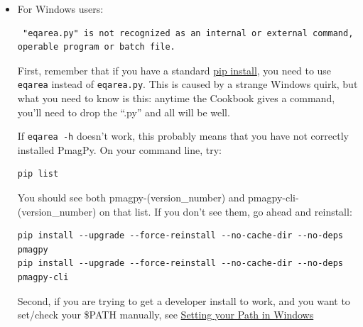 \documentclass[11pt]{book}
\begin{document}
{{{{{{\begin{enumerate}
\begin{itemize}



\item For Windows users:

\begin{verbatim} "eqarea.py" is not recognized as an internal or external command,
operable program or batch file.
\end{verbatim}

First, remember that if you have a standard \href{#pip_install}{pip install}, you need to use \texttt{eqarea} instead of \texttt{eqarea.py}. This is caused by a strange Windows quirk, but what you need to know is this: anytime the Cookbook gives a command, you'll need to drop the ``.py'' and all will be well.

If \texttt{eqarea -h} doesn't work, this probably means that you have not correctly installed PmagPy.  On your command line, try:

\begin{verbatim}
pip list
\end{verbatim}

You should see both pmagpy-(version_number) and pmagpy-cli-(version_number) on that list.  If you don't see them, go ahead and reinstall:

\begin{verbatim}
pip install --upgrade --force-reinstall --no-cache-dir --no-deps pmagpy
pip install --upgrade --force-reinstall --no-cache-dir --no-deps pmagpy-cli
\end{verbatim}

Second, if you are trying to get a developer install to work, and you want to set/check your \$PATH manually, see \href{http://www.mathworks.com/matlabcentral/answers/94933-how-do-i-set-my-system-path-under-windows}{Setting your Path in Windows}



\end{itemize}
\end{enumerate}}}}}}}
\end{document}
